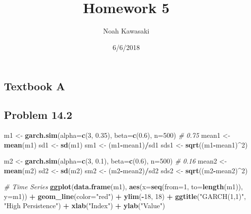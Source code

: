 \documentclass[]{article}
\title{Homework 5}
\author{Noah Kawasaki}
\date{6/6/2018}
\newenvironment{Shaded}{\begin{snugshade}}{\end{snugshade}}
\newcommand{\KeywordTok}[1]{\textcolor[rgb]{0.13,0.29,0.53}{\textbf{#1}}}
\newcommand{\DataTypeTok}[1]{\textcolor[rgb]{0.13,0.29,0.53}{#1}}
\newcommand{\DecValTok}[1]{\textcolor[rgb]{0.00,0.00,0.81}{#1}}
\newcommand{\FloatTok}[1]{\textcolor[rgb]{0.00,0.00,0.81}{#1}}
\newcommand{\StringTok}[1]{\textcolor[rgb]{0.31,0.60,0.02}{#1}}
\newcommand{\CommentTok}[1]{\textcolor[rgb]{0.56,0.35,0.01}{\textit{#1}}}
\newcommand{\OperatorTok}[1]{\textcolor[rgb]{0.81,0.36,0.00}{\textbf{#1}}}
\newcommand{\NormalTok}[1]{#1}
\begin{document}
\maketitle

\subsection{Textbook A}\label{textbook-a}

\subsection{Problem 14.2}\label{problem-14.2}

\begin{Shaded}
\begin{Highlighting}[]
\NormalTok{m1 <-}\StringTok{ }\KeywordTok{garch.sim}\NormalTok{(}\DataTypeTok{alpha=}\KeywordTok{c}\NormalTok{(}\DecValTok{3}\NormalTok{, }\FloatTok{0.35}\NormalTok{), }\DataTypeTok{beta=}\KeywordTok{c}\NormalTok{(}\FloatTok{0.6}\NormalTok{), }\DataTypeTok{n=}\DecValTok{500}\NormalTok{)  }\CommentTok{# 0.75}
\NormalTok{mean1 <-}\StringTok{ }\KeywordTok{mean}\NormalTok{(m1)}
\NormalTok{sd1 <-}\StringTok{ }\KeywordTok{sd}\NormalTok{(m1)}
\NormalTok{sm1 <-}\StringTok{ }\NormalTok{(m1}\OperatorTok{-}\NormalTok{mean1)}\OperatorTok{/}\NormalTok{sd1}
\NormalTok{sds1 <-}\StringTok{ }\KeywordTok{sqrt}\NormalTok{((m1}\OperatorTok{-}\NormalTok{mean1)}\OperatorTok{^}\DecValTok{2}\NormalTok{)}

\NormalTok{m2 <-}\StringTok{ }\KeywordTok{garch.sim}\NormalTok{(}\DataTypeTok{alpha=}\KeywordTok{c}\NormalTok{(}\DecValTok{3}\NormalTok{, }\FloatTok{0.1}\NormalTok{), }\DataTypeTok{beta=}\KeywordTok{c}\NormalTok{(}\FloatTok{0.6}\NormalTok{), }\DataTypeTok{n=}\DecValTok{500}\NormalTok{)  }\CommentTok{# 0.16}
\NormalTok{mean2 <-}\StringTok{ }\KeywordTok{mean}\NormalTok{(m2)}
\NormalTok{sd2 <-}\StringTok{ }\KeywordTok{sd}\NormalTok{(m2)}
\NormalTok{sm2 <-}\StringTok{ }\NormalTok{(m2}\OperatorTok{-}\NormalTok{mean2)}\OperatorTok{/}\NormalTok{sd2}
\NormalTok{sds2 <-}\StringTok{ }\KeywordTok{sqrt}\NormalTok{((m2}\OperatorTok{-}\NormalTok{mean2)}\OperatorTok{^}\DecValTok{2}\NormalTok{)}

\CommentTok{# Time Series}
\KeywordTok{ggplot}\NormalTok{(}\KeywordTok{data.frame}\NormalTok{(m1), }\KeywordTok{aes}\NormalTok{(}\DataTypeTok{x=}\KeywordTok{seq}\NormalTok{(}\DataTypeTok{from=}\DecValTok{1}\NormalTok{, }\DataTypeTok{to=}\KeywordTok{length}\NormalTok{(m1)), }\DataTypeTok{y=}\NormalTok{m1)) }\OperatorTok{+}
\StringTok{  }\KeywordTok{geom_line}\NormalTok{(}\DataTypeTok{color=}\StringTok{"red"}\NormalTok{) }\OperatorTok{+}
\StringTok{  }\KeywordTok{ylim}\NormalTok{(}\OperatorTok{-}\DecValTok{18}\NormalTok{, }\DecValTok{18}\NormalTok{) }\OperatorTok{+}
\StringTok{  }\KeywordTok{ggtitle}\NormalTok{(}\StringTok{"GARCH(1,1)"}\NormalTok{, }\StringTok{"High Persistence"}\NormalTok{) }\OperatorTok{+}
\StringTok{  }\KeywordTok{xlab}\NormalTok{(}\StringTok{"Index"}\NormalTok{) }\OperatorTok{+}
\StringTok{  }\KeywordTok{ylab}\NormalTok{(}\StringTok{"Value"}\NormalTok{)}
\end{Highlighting}
\end{Shaded}
\end{document}
